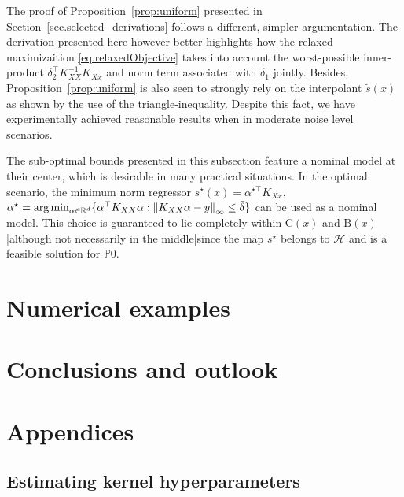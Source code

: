 \begin{remark}
	The proof of Proposition~\ref{prop:uniform} presented in Section~\ref{sec.selected_derivations} follows a different, simpler argumentation. The derivation presented here however better highlights how the relaxed maximizaition \eqref{eq.relaxedObjective} takes into account the worst-possible inner-product $\delta_2^\top K_{XX}^{-1}K_{Xx}$ and norm term associated with $\delta_1$ jointly. Besides, Proposition~\ref{prop:uniform} is also seen to strongly rely on the interpolant $\tilde s(x)$ as shown by the use of the triangle-inequality.  Despite this fact, we have experimentally achieved reasonable results when in moderate noise level scenarios.
\end{remark}

\begin{remark}
	The sub-optimal bounds presented in this subsection feature a nominal model at their center, which is desirable in many practical situations. In the optimal scenario, the minimum norm regressor $s^\star(x) = \alpha^{\star\top} K_{Xx}$, $\alpha^\star = \text{arg}\min_{\alpha \in \mathbb{R}^d} \{ \alpha^\top K_{XX} \alpha : \left\| K_{XX} \alpha - y \right\|_\infty \leq \bar\delta \}$ can be used as a nominal model. This choice is guaranteed to lie completely within $\text{C}(x)$ and $\text{B}(x)$|although not necessarily in the middle|since the map $s^\star$ belongs to $\mathcal{H}$ and is a feasible solution for $\mathds{P}0$.
\end{remark}

\section{Numerical examples}



\section{Conclusions and outlook}

\section{Appendices}

\subsection{Estimating kernel hyperparameters}

